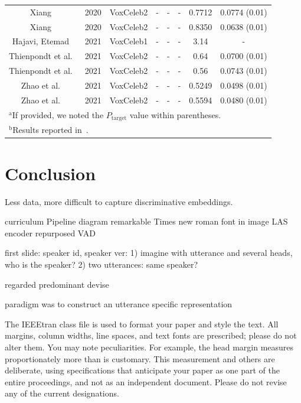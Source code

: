 \documentclass[conference]{IEEEtran}
\begin{document}
\begin{table}[htbp]
\begin{center}
\begin{tabular}{|c|c|c|c|c|c|c|c|}
        Xiang~\cite{xiang2020xx205} & 2020 & VoxCeleb2 & - & - & - & 0.7712 & 0.0774 (0.01) \\
        Xiang~\cite{xiang2020xx205} & 2020 & VoxCeleb2 & - & - & - & 0.8350 & 0.0638 (0.01) \\
        Hajavi, Etemad~\cite{hajavi2021siamese} & 2021 & VoxCeleb1 & - & - & - & 3.14 & - \\
        Thienpondt et al.~\cite{thienpondt2021voxsrc} & 2021 & VoxCeleb2 & - & - & - & 0.64 & 0.0700 (0.01) \\
        Thienpondt et al.~\cite{thienpondt2021voxsrc} & 2021 & VoxCeleb2 & - & - & - & 0.56 & 0.0743 (0.01) \\
        Zhao et al.~\cite{zhao2021speakin} & 2021 & VoxCeleb2 & - & - & - & 0.5249 & 0.0498 (0.01) \\
        Zhao et al.~\cite{zhao2021speakin} & 2021 & VoxCeleb2 & - & - & - & 0.5594 & 0.0480 (0.01) \\
        \hline
        \multicolumn{8}{l}{$^{\mathrm{a}}$If provided, we noted the $P_{\text{target}}$ value within parentheses.} \\
        \multicolumn{8}{l}{$^{\mathrm{b}}$Results reported in~\cite{nagrani2020voxceleb}.}
        \end{tabular}
        \label{tab:dataset}
    \end{center}
\end{table}

\section{Conclusion}

Less data, more difficult to capture discriminative embeddings.


curriculum
Pipeline diagram
remarkable
Times new roman font in image
LAS encoder repurposed
VAD

first slide: speaker id, speaker ver: 1) imagine with utterance and several heads, who is the speaker? 2) two utterances: same speaker?

regarded
predominant 
devise

paradigm was to construct an utterance specific representation  



The IEEEtran class file is used to format your paper and style the text. All margins, 
column widths, line spaces, and text fonts are prescribed; please do not 
alter them. You may note peculiarities. For example, the head margin
measures proportionately more than is customary. This measurement 
and others are deliberate, using specifications that anticipate your paper 
as one part of the entire proceedings, and not as an independent document. 
Please do not revise any of the current designations.
\end{document}

